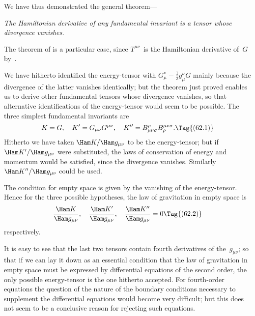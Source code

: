 \documentclass[12pt]{book}
\begin{document}
We have thus demonstrated the general theorem---

\emph{The Hamiltonian derivative of any fundamental invariant is a tensor whose
%
divergence vanishes.}
%

The theorem of  is a particular case, since $T^{\mu\nu}$~is the Hamiltonian
derivative of~$G$ by~.

%
%

We have hitherto identified the energy\hyp{}tensor with $G_{\mu}^{\nu} - \tfrac{1}{2} g_{\mu}^{\nu}G$ mainly
because the divergence of the latter vanishes identically; but the theorem
just proved enables us to derive other fundamental tensors whose divergence
vanishes, so that alternative identifications of the energy\hyp{}tensor would seem
to be possible. The three simplest fundamental invariants are
\[
K = G,\quad
K' = G_{\mu\nu} G^{\mu\nu},\quad
K'' = B_{\mu\nu\sigma}^{\rho} B_{\rho}^{\mu\nu\sigma}.
\Tag{(62.1)}
\]
Hitherto we have taken $\Ham K/\Ham g_{\mu\nu}$ to be the energy\hyp{}tensor; but if $\Ham K'/\Ham g_{\mu\nu}$
were substituted, the laws of conservation of energy and momentum would be
satisfied, since the divergence vanishes. Similarly $\Ham K''/\Ham g_{\mu\nu}$ could be used.

The condition for empty space is given by the vanishing of the energy\hyp{}tensor.
Hence for the three possible hypotheses, the law of gravitation in
empty space is
\[
\frac{\Ham K}{\Ham g_{\mu\nu}},\quad
\frac{\Ham K'}{\Ham g_{\mu\nu}},\quad
\frac{\Ham K''}{\Ham g_{\mu\nu}} = 0
\Tag{(62.2)}
\]
respectively.

It is easy to see that the last two tensors contain fourth derivatives of the~$g_{\mu\nu}$;
so that if we can lay it down as an essential condition that the law of
gravitation in empty space must be expressed by differential equations of the
second order, the only possible energy\hyp{}tensor is the one hitherto accepted.
For fourth\hyp{}order equations the question of the nature of the boundary conditions
necessary to supplement the differential equations would become very
difficult; but this does not seem to be a conclusive reason for rejecting such
equations.
\end{document}
